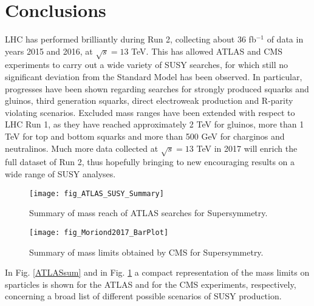 \documentclass{ws-ijmpcs}
\begin{document}
\section{Conclusions}

LHC has performed brilliantly during Run 2, collecting about 36 fb$^{-1}$ of data in years 2015 and 2016, at $\sqrt{s} = 13$ TeV. This has allowed ATLAS and CMS experi\-ments to carry out a wide variety of SUSY searches, for which still no significant deviation from the Standard Model has been observed.
In particular, progresses have been shown regarding searches for strongly produced squarks and gluinos, third generation squarks, direct electroweak production and R-parity violating scenarios. Excluded mass ranges have been extended with respect to LHC Run 1, as they have reached approximately 2 TeV for gluinos, more than 1 TeV for top and bottom squarks and more than 500 GeV for charginos and neutralinos.
Much more data collected at $\sqrt{s} = 13$ TeV in 2017 will enrich the full dataset of Run 2, thus hopefully bringing to new encouraging results on a wide range of SUSY analyses.

\begin{figure}[!tbp]
  \centering
  \begin{minipage}[b]{0.45\textwidth}
    \texttt{[image: fig\_ATLAS\_SUSY\_Summary]}
    \caption{Summary of mass reach of ATLAS searches for Supersymmetry. \label{ATLASsum}}
  \end{minipage}
  \hfill
  \begin{minipage}[b]{0.45\textwidth}
    \texttt{[image: fig\_Moriond2017\_BarPlot]}
    \caption{Summary of mass limits obtained by CMS for Supersymmetry. \label{CMSsum}}
  \end{minipage}
\end{figure}
In Fig. \ref{ATLASsum} and in Fig. \ref{CMSsum} a compact representation of the mass limits on sparticles is shown for the ATLAS and for the CMS experiments, respectively, concerning a broad list of different possible scenarios of SUSY production.
\end{document}
